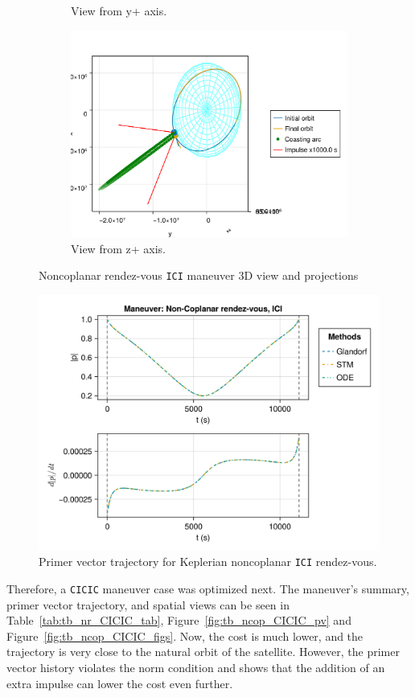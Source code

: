 \begin{figure}[htbp]
\begin{subfigure}{0.49\linewidth}
        \caption{View from y+ axis.}
    \end{subfigure}
    \begin{subfigure}{0.49\linewidth}
        \includegraphics[width=0.8\linewidth]{../results/two_body/ipv_noncop/ICI_z+.png}
        \caption{View from z+ axis.}
    \end{subfigure}
    \caption{Noncoplanar rendez-vous \texttt{ICI} maneuver 3D view and projections}
    \label{fig:tb_ncop_ICI_figs}
\end{figure}

\begin{figure}[htbp]
    \centering
    \includegraphics[width=0.7\linewidth]{../results/two_body/ipv_noncop/ICI_primer_vector.png}
    \caption{Primer vector trajectory for Keplerian noncoplanar \texttt{ICI} rendez-vous.}
    \label{fig:tb_ncop_ICI_pv}
\end{figure}
\FloatBarrier
Therefore, a \texttt{CICIC} maneuver case was optimized next. The maneuver's summary, primer vector trajectory, and spatial views can be seen in Table~\ref{tab:tb_nr_CICIC_tab}, Figure~\ref{fig:tb_ncop_CICIC_pv} and Figure~\ref{fig:tb_ncop_CICIC_figs}. Now, the cost is much lower, and the trajectory is very close to the natural orbit of the satellite. However, the primer vector history violates the norm condition and shows that the addition of an extra impulse can lower the cost even further. 

